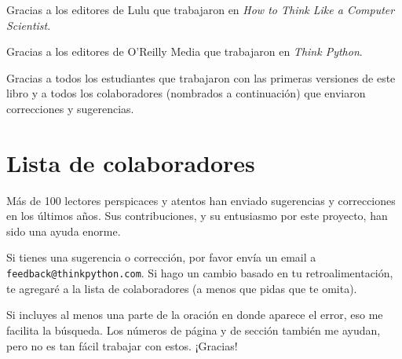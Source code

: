 \documentclass[10pt]{book}
\begin{document}
Gracias a los editores de Lulu que trabajaron en
{\em How to Think Like a Computer Scientist}.

Gracias a los editores de O'Reilly Media que trabajaron en
{\em Think Python}.

Gracias a todos los estudiantes que trabajaron con las primeras
versiones de este libro y a todos los colaboradores (nombrados
a continuación) que enviaron correcciones y sugerencias.


\section*{Lista de colaboradores}

Más de 100 lectores perspicaces y atentos han enviado
sugerencias y correcciones en los últimos años.  Sus
contribuciones, y su entusiasmo por este proyecto, han sido una
ayuda enorme.

Si tienes una sugerencia o corrección, por favor envía un email a
{\tt feedback@thinkpython.com}.  Si hago un cambio basado en tu
retroalimentación, te agregaré a la lista de colaboradores
(a menos que pidas que te omita).

Si incluyes al menos una parte de la oración en donde
aparece el error, eso me facilita la búsqueda.  Los números de página
y de sección también me ayudan, pero no es tan fácil trabajar con estos.
¡Gracias!
\end{document}
